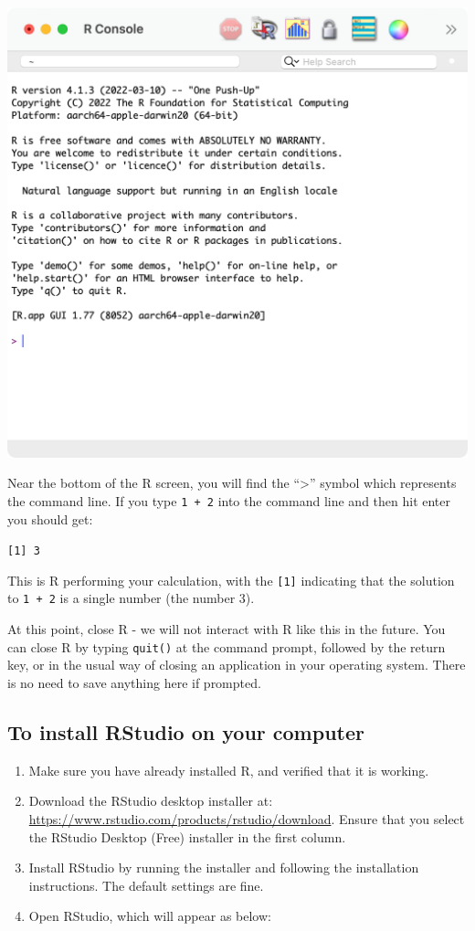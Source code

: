 \documentclass[
]{memoir}
\providecommand{\tightlist}{%
  \setlength{\itemsep}{0pt}\setlength{\parskip}{0pt}}
\begin{document}
\includegraphics[width=0.8\linewidth]{img/R-screenshot}

Near the bottom of the R screen, you will find the ``\textgreater{}'' symbol which represents the command line. If you type \texttt{1\ +\ 2} into the command line and then hit enter you should get:

\texttt{{[}1{]}\ 3}

This is R performing your calculation, with the \texttt{{[}1{]}} indicating that the solution to \texttt{1\ +\ 2} is a single number (the number 3).

At this point, close R - we will not interact with R like this in the future. You can close R by typing \texttt{quit()} at the command prompt, followed by the return key, or in the usual way of closing an application in your operating system. There is no need to save anything here if prompted.

\hypertarget{to-install-rstudio-on-your-computer}{%
\subsection{To install RStudio on your computer}\label{to-install-rstudio-on-your-computer}}

\begin{enumerate}
\def\labelenumi{\arabic{enumi}.}
\tightlist
\item
  Make sure you have already installed R, and verified that it is working.
\item
  Download the RStudio desktop installer at: \url{https://www.rstudio.com/products/rstudio/download}. Ensure that you select the RStudio Desktop (Free) installer in the first column.
\item
  Install RStudio by running the installer and following the installation instructions. The default settings are fine.
\item
  Open RStudio, which will appear as below:
\end{enumerate}
\end{document}
